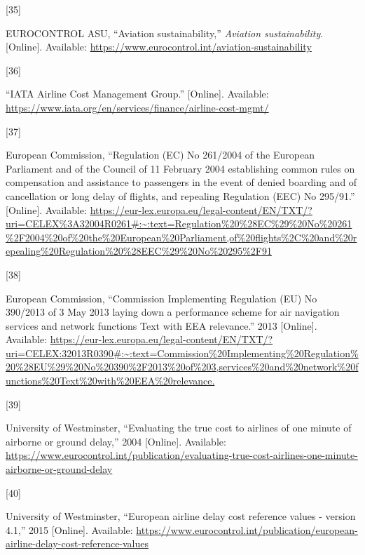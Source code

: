 \documentclass[
  11pt,
  a4paper,
]{book}
\newlength{\cslhangindent}
\newlength{\csllabelwidth}
\newlength{\cslentryspacingunit} %
\newenvironment{CSLReferences}[2] %
 {%
  \setlength{\parindent}{0pt}
  \ifodd #1
  \let\oldpar\par
  \def\par{\hangindent=\cslhangindent\oldpar}
  \fi
  \setlength{\parskip}{#2\cslentryspacingunit}
 }%
 {}
\newcommand{\CSLLeftMargin}[1]{\parbox[t]{\csllabelwidth}{#1}}
\newcommand{\CSLRightInline}[1]{\parbox[t]{\linewidth - \csllabelwidth}{#1}\break}
\begin{document}
\begin{CSLReferences}{0}{0}
\leavevmode{}%
\CSLLeftMargin{{[}35{]} }%
\CSLRightInline{EUROCONTROL ASU, {``Aviation sustainability,''}
\emph{Aviation sustainability}. {[}Online{]}. Available:
\url{https://www.eurocontrol.int/aviation-sustainability}}

\leavevmode{}%
\CSLLeftMargin{{[}36{]} }%
\CSLRightInline{{``{IATA Airline Cost Management Group}.''}
{[}Online{]}. Available:
\url{https://www.iata.org/en/services/finance/airline-cost-mgmt/}}

\leavevmode{}%
\CSLLeftMargin{{[}37{]} }%
\CSLRightInline{European Commission, {``Regulation ({EC}) {No} 261/2004
of the {European Parliament} and of the {Council} of 11 {February} 2004
establishing common rules on compensation and assistance to passengers
in the event of denied boarding and of cancellation or long delay of
flights, and repealing {Regulation} ({EEC}) {No} 295/91.''}
{[}Online{]}. Available:
\url{https://eur-lex.europa.eu/legal-content/EN/TXT/?uri=CELEX\%3A32004R0261\#:~:text=Regulation\%20\%28EC\%29\%20No\%20261\%2F2004\%20of\%20the\%20European\%20Parliament,of\%20flights\%2C\%20and\%20repealing\%20Regulation\%20\%28EEC\%29\%20No\%20295\%2F91}}

\leavevmode{}%
\CSLLeftMargin{{[}38{]} }%
\CSLRightInline{European Commission, {``Commission {Implementing
Regulation} ({EU}) {No} 390/2013 of 3 {May} 2013 laying down a
performance scheme for air navigation services and network functions
{Text} with {EEA} relevance.''} 2013 {[}Online{]}. Available:
\url{https://eur-lex.europa.eu/legal-content/EN/TXT/?uri=CELEX:32013R0390\#:~:text=Commission\%20Implementing\%20Regulation\%20\%28EU\%29\%20No\%20390\%2F2013\%20of\%203,services\%20and\%20network\%20functions\%20Text\%20with\%20EEA\%20relevance.}}

\leavevmode{}%
\CSLLeftMargin{{[}39{]} }%
\CSLRightInline{University of Westminster, {``Evaluating the true cost
to airlines of one minute of airborne or ground delay,''} 2004
{[}Online{]}. Available:
\url{https://www.eurocontrol.int/publication/evaluating-true-cost-airlines-one-minute-airborne-or-ground-delay}}

\leavevmode{}%
\CSLLeftMargin{{[}40{]} }%
\CSLRightInline{University of Westminster, {``European airline delay
cost reference values - version 4.1,''} 2015 {[}Online{]}. Available:
\url{https://www.eurocontrol.int/publication/european-airline-delay-cost-reference-values}}


\end{CSLReferences}
\end{document}
